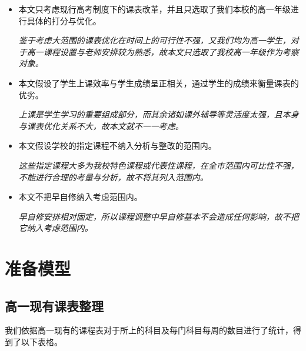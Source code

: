 \documentclass[a4paper]{article}
\begin{document}
 \begin{itemize}

 \item 本文只考虑现行高考制度下的课表改革，并且只选取了我们本校的高一年级进行具体的打分与优化。

 {\it 鉴于考虑大范围的课表优化在时间上的可行性不强，又我们均为高一学生，对于高一课程设置与老师安排较为熟悉，故本文只选取了我校高一年级作为考察对象。}

 \item 本文假设了学生上课效率与学生成绩呈正相关，通过学生的成绩来衡量课表的优劣。

 {\it 上课是学生学习的重要组成部分，而其余诸如课外辅导等灵活度太强，且本身与课表优化关系不大，故本文就不一一考虑。}

 \item 本文假设学校的指定课程不纳入分析与整改的范围内。

 {\it 这些指定课程大多为我校特色课程或代表性课程，在全市范围内可比性不强，不能进行合理的考量与分析，故不将其列入范围内。}

 \item 本文不把早自修纳入考虑范围内。

 {\it 早自修安排相对固定，所以课程调整中早自修基本不会造成任何影响，故不把它纳入考虑范围内。}

 \end{itemize}

\clearpage

\section{准备模型}

 \subsection{高一现有课表整理}

  我们依据高一现有的课程表对于所上的科目及每门科目每周的数目进行了统计，得到了以下表格。
\end{document}
